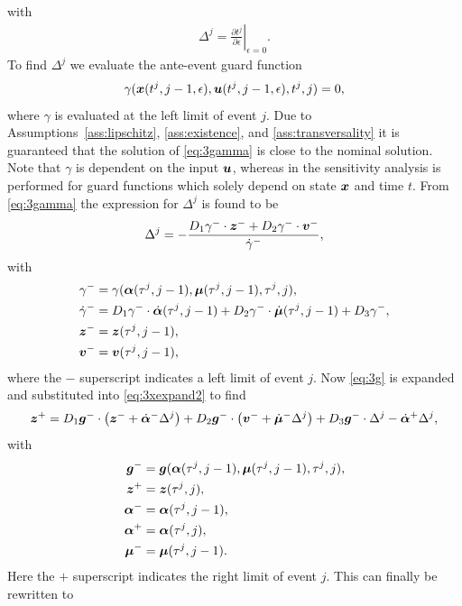 \documentclass[../DC2017114Bouma.tex]{subfiles}
\begin{document}
with
\begin{align}
\Delta^{j} = \left.\frac{\partial t^{j}}{\partial\epsilon}\right|_{\epsilon=0}.\label{eq:3Delta}
\end{align}
To find $\Delta^{j}$ we evaluate the ante-event guard function
\begin{align}
\gamma({\boldsymbol{x}}(t^{j},j-1,\epsilon),{\boldsymbol{u}}(t^{j},j-1,\epsilon),t^{j},j) = 0,\label{eq:3gamma}
\end{align}
where $\gamma$ is evaluated at the left limit of event $j$. Due to Assumptions~\ref{ass:lipschitz}, \ref{ass:existence}, and \ref{ass:transversality} it is guaranteed that the solution of \eqref{eq:3gamma} is close to the nominal solution. Note that $\gamma$ is dependent on the input ${\boldsymbol{u}}$, whereas in \cite{Chen2018a} the sensitivity analysis is performed for guard functions which solely depend on state ${\boldsymbol{x}}$ and time $t$. From \eqref{eq:3gamma} the expression for $\Delta^{j}$ is found to be
\begin{align}
\Delta^{j} = -\frac{D_1\gamma^{-}\cdot{\boldsymbol{z}}^- + D_2\gamma^{-}\cdot{\boldsymbol{v}}^-}{\dot{\gamma}^{-}},\label{eq}
\end{align}
with
\begin{align}
\gamma^- &= \gamma(\boldsymbol{\alpha}(\tau^j,j-1),\boldsymbol{\mu}(\tau^j,j-1),\tau^j,j),\\
\dot{\gamma}^- &= D_1\gamma^-\cdot\dot{\boldsymbol{\alpha}}(\tau^j,j-1) + D_2\gamma^-\cdot\dot{\boldsymbol{\mu}}(\tau^j,j-1) + D_3\gamma^-,\\
{\boldsymbol{z}}^- &= {\boldsymbol{z}}(\tau^j,j-1),\\
{\boldsymbol{v}}^- &= {\boldsymbol{v}}(\tau^j,j-1),
\end{align}
where the $-$ superscript indicates a left limit of event $j$. Now \eqref{eq:3g} is expanded and substituted  into \eqref{eq:3xexpand2} to find
\begin{equation}
{\boldsymbol{z}}^+ = D_1{\boldsymbol{g}}^-\cdot\left({\boldsymbol{z}}^- + \dot{\boldsymbol{\alpha}}^-\Delta^j\right) + D_2{\boldsymbol{g}}^-\cdot\left({\boldsymbol{v}}^- + \dot{\boldsymbol{\mu}}^-\Delta^j\right) + D_3{\boldsymbol{g}}^-\cdot\Delta^j - \dot{\boldsymbol{\alpha}}^+\Delta^j,
\end{equation}
with
\begin{align}
{\boldsymbol{g}}^- &= {\boldsymbol{g}}(\boldsymbol{\alpha}(\tau^j,j-1),\boldsymbol{\mu}(\tau^j,j-1),\tau^j,j),\\
{\boldsymbol{z}}^+ &= {\boldsymbol{z}}(\tau^j,j),\\
\boldsymbol{\alpha}^- &= \boldsymbol{\alpha}(\tau^j,j-1),\\
\boldsymbol{\alpha}^+ &= \boldsymbol{\alpha}(\tau^j,j),\\
\boldsymbol{\mu}^- &= \boldsymbol{\mu}(\tau^j,j-1).
\end{align}
Here the $+$ superscript indicates the right limit of event $j$. This can finally be rewritten to
\end{document}
